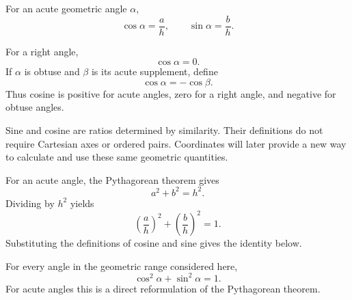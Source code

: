 \begin{definitionbox}
For an acute geometric angle $\alpha$,
\[
\boxed{
\cos\alpha=\frac{a}{h},
\qquad
\sin\alpha=\frac{b}{h}
}.
\]
\end{definitionbox}

\begin{definitionbox}
For a right angle,
\[
\boxed{\cos\alpha=0}.
\]
If $\alpha$ is obtuse and $\beta$ is its acute supplement, define
\[
\boxed{\cos\alpha=-\cos\beta}.
\]
Thus cosine is positive for acute angles, zero for a right angle, and negative
for obtuse angles.
\end{definitionbox}

\begin{interpretationbox}
Sine and cosine are ratios determined by similarity. Their definitions do not
require Cartesian axes or ordered pairs. Coordinates will later provide a new
way to calculate and use these same geometric quantities.
\end{interpretationbox}

\begin{derivationbox}
For an acute angle, the Pythagorean theorem gives
\[
a^2+b^2=h^2.
\]
Dividing by $h^2$ yields
\[
\left(\frac{a}{h}\right)^2+
\left(\frac{b}{h}\right)^2=1.
\]
Substituting the definitions of cosine and sine gives the identity below.
\end{derivationbox}

\begin{theorembox}
For every angle in the geometric range considered here,
\[
\boxed{\cos^2\alpha+\sin^2\alpha=1}.
\]
For acute angles this is a direct reformulation of the Pythagorean theorem.
\end{theorembox}
